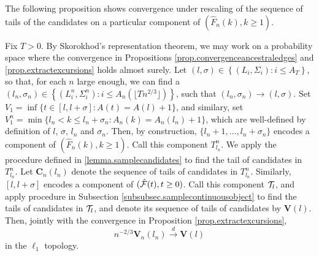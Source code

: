 The following proposition shows convergence under rescaling of the sequence of tails of the candidates on a particular component of $(\hat{F}_n(k),k\geq 1)$. 
\begin{proposition}\label{prop.convergencestartingpointscandidates}
Fix $T>0$. By Skorokhod's representation theorem, we may work on a probability space where the convergence in Propositions \ref{prop.convergenceancestraledges} and \ref{prop.extractexcursions} holds almost surely. Let $(l,\sigma)\in \left\{(L_i,\Sigma_i):i\leq A_T\right\}$, so that, for each $n$ large enough, we can find a $(l_n,\sigma_n)\in\left\{(L_i^n,\Sigma_i^n):i\leq A_n\left(\lfloor Tn^{2/3}\rfloor\right)\right\}$, such that $(l_n,\sigma_n)\to (l,\sigma)$. Set $V_1=\inf\{t\in [l,l+\sigma]:A(t)=A(l)+1\}$, and similary, set $V_1^n=\min\{l_n<k\leq l_n+\sigma_n:A_n(k)=A_n(l_n)+1\}$, which are well-defined by definition of $l$, $\sigma$, $l_n$ and $\sigma_n$.  Then, by construction, $\{l_n+1,\dots,l_n+\sigma_n\}$ encodes a component of $(\hat{F}_n(k),k\geq 1)$. Call this component $T^n_{l_n}$. We apply the procedure defined in \ref{lemma.samplecandidates} to find the tail of candidates in $T^n_{l_n}$. Let $\mathbf{C}_n(l_n)$ denote the sequence of tails of candidates in $T^n_{l_n}$. Similarly, $[l,l+\sigma]$ encodes a component of $(\hat{{\mathcal F}}(t),t\geq 0)$. Call this component ${\mathcal T}_l$, and apply procedure in Subsection \ref{subsubsec.samplecontinuousobject} to find the tails of candidates in ${\mathcal T}_l$, and denote its sequence of tails of candidates by $\mathbf{V}(l)$. Then, jointly with the convergence in Proposition \ref{prop.extractexcursions}, 
$$n^{-2/3}\mathbf{V}_n(l_n)\overset{d}{\to}\mathbf{V}(l)$$
in the $\ell_1$ topology.
\end{proposition}
